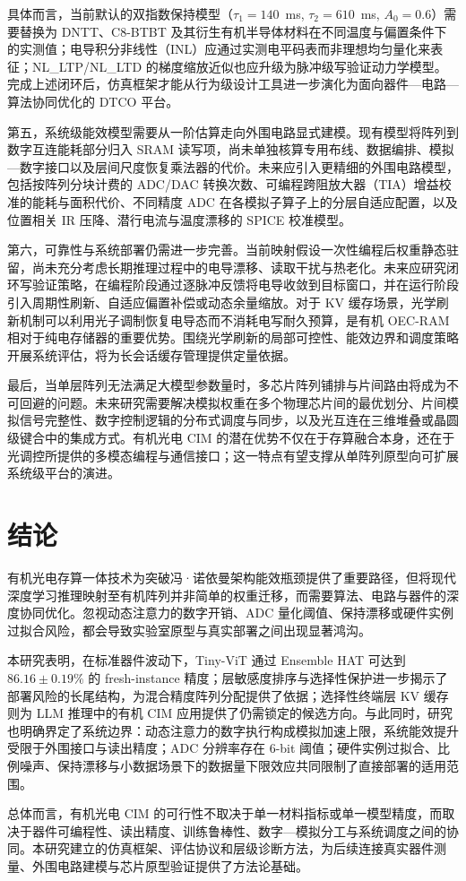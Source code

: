 具体而言，当前默认的双指数保持模型（$\tau_1=140$~ms, $\tau_2=610$~ms, $A_0=0.6$）需要替换为 DNTT、C8-BTBT 及其衍生有机半导体材料在不同温度与偏置条件下的实测值；电导积分非线性（INL）应通过实测电平码表而非理想均匀量化来表征；NL\_LTP/NL\_LTD 的梯度缩放近似也应升级为脉冲级写验证动力学模型。完成上述闭环后，仿真框架才能从行为级设计工具进一步演化为面向器件—电路—算法协同优化的 DTCO 平台。

第五，系统级能效模型需要从一阶估算走向外围电路显式建模。现有模型将阵列到数字互连能耗部分归入 SRAM 读写项，尚未单独核算专用布线、数据编排、模拟—数字接口以及层间尺度恢复乘法器的代价。未来应引入更精细的外围电路模型，包括按阵列分块计费的 ADC/DAC 转换次数、可编程跨阻放大器（TIA）增益校准的能耗与面积代价、不同精度 ADC 在各模拟子算子上的分层自适应配置，以及位置相关 IR 压降、潜行电流与温度漂移的 SPICE 校准模型。

第六，可靠性与系统部署仍需进一步完善。当前映射假设一次性编程后权重静态驻留，尚未充分考虑长期推理过程中的电导漂移、读取干扰与热老化。未来应研究闭环写验证策略，在编程阶段通过逐脉冲反馈将电导收敛到目标窗口，并在运行阶段引入周期性刷新、自适应偏置补偿或动态余量缩放。对于 KV 缓存场景，光学刷新机制可以利用光子调制恢复电导态而不消耗电写耐久预算，是有机 OEC-RAM 相对于纯电存储器的重要优势。围绕光学刷新的局部可控性、能效边界和调度策略开展系统评估，将为长会话缓存管理提供定量依据。

最后，当单层阵列无法满足大模型参数量时，多芯片阵列铺排与片间路由将成为不可回避的问题。未来研究需要解决模拟权重在多个物理芯片间的最优划分、片间模拟信号完整性、数字控制逻辑的分布式调度与同步，以及光互连在三维堆叠或晶圆级键合中的集成方式。有机光电 CIM 的潜在优势不仅在于存算融合本身，还在于光调控所提供的多模态编程与通信接口；这一特点有望支撑从单阵列原型向可扩展系统级平台的演进。

\section{结论}

有机光电存算一体技术为突破冯·诺依曼架构能效瓶颈提供了重要路径，但将现代深度学习推理映射至有机阵列并非简单的权重迁移，而需要算法、电路与器件的深度协同优化。忽视动态注意力的数字开销、ADC 量化阈值、保持漂移或硬件实例过拟合风险，都会导致实验室原型与真实部署之间出现显著鸿沟。

本研究表明，在标准器件波动下，Tiny-ViT 通过 Ensemble HAT 可达到 $86.16\pm0.19\%$ 的 fresh-instance 精度；层敏感度排序与选择性保护进一步揭示了部署风险的长尾结构，为混合精度阵列分配提供了依据；选择性终端层 KV 缓存则为 LLM 推理中的有机 CIM 应用提供了仍需锁定的候选方向。与此同时，研究也明确界定了系统边界：动态注意力的数字执行构成模拟加速上限，系统能效提升受限于外围接口与读出精度；ADC 分辨率存在 6-bit 阈值；硬件实例过拟合、比例噪声、保持漂移与小数据场景下的数据量下限效应共同限制了直接部署的适用范围。

总体而言，有机光电 CIM 的可行性不取决于单一材料指标或单一模型精度，而取决于器件可编程性、读出精度、训练鲁棒性、数字—模拟分工与系统调度之间的协同。本研究建立的仿真框架、评估协议和层级诊断方法，为后续连接真实器件测量、外围电路建模与芯片原型验证提供了方法论基础。
